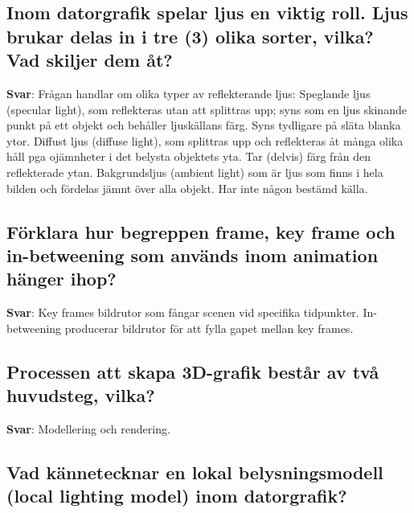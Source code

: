 \documentclass[a4paper,11pt,oneside]{article}
\begin{document}
\begin{sloppypar}
\subsection{Inom datorgrafik spelar ljus en viktig roll. Ljus brukar delas in i tre (3) olika sorter, vilka? Vad skiljer dem \r{a}t?}

\label{q:306:sa:sv:True}

\textbf{Svar}: Fr\r{a}gan handlar om olika typer av reflekterande ljus: Speglande ljus (specular light), som reflekteras utan att splittras upp; syns som en ljus skinande punkt p\r{a} ett objekt och beh\r{a}ller ljusk\"allans f\"arg. Syns tydligare p\r{a} sl\"ata blanka ytor. Diffust ljus (diffuse light), som splittras upp och reflekteras \r{a}t m\r{a}nga olika h\r{a}ll pga oj\"amnheter i det belysta objektets yta. Tar (delvis) f\"arg fr\r{a}n den reflekterade ytan. Bakgrundsljus (ambient light) som \"ar ljus som finns i hela bilden och f\"ordelas j\"amnt \"over alla objekt. Har inte n\r{a}gon best\"amd k\"alla.



\subsection{F\"orklara hur begreppen frame, key frame och in-betweening som anv\"ands inom animation h\"anger ihop?}

\label{q:307:sa:sv:True}

\textbf{Svar}: Key frames {\textendash} bildrutor som f\r{a}ngar scenen vid specifika tidpunkter. In-betweening {\textendash} producerar bildrutor f\"or att fylla gapet mellan key frames.



\subsection{Processen att skapa 3D-grafik best\r{a}r av tv\r{a} huvudsteg, vilka?}

\label{q:308:sa:sv:True}

\textbf{Svar}: Modellering och rendering.



\subsection{Vad k\"annetecknar en lokal belysningsmodell (local lighting model) inom datorgrafik?}

\label{q:309:sa:sv:True}


\end{sloppypar}
\end{document}
